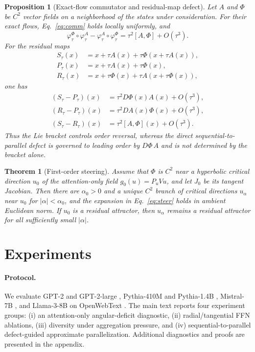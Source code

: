 \documentclass[11pt]{article}
\newtheorem{theorem}{Theorem}
\newtheorem{proposition}{Proposition}
\begin{document}
\begin{proposition}[Exact-flow commutator and residual-map defect]\label{prop:comm}
Let $A$ and $\Phi$ be $C^2$ vector fields on a neighborhood of the states under
consideration. For their exact flows, Eq.~\eqref{eq:comm} holds locally uniformly,
and
\[
\varphi^\Phi_\tau\circ\varphi^A_\tau-
\varphi^A_\tau\circ\varphi^\Phi_\tau
=\tau^2[A,\Phi]+O(\tau^3).
\]
For the residual maps
\[
\begin{aligned}
S_\tau(x)&=x+\tau A(x)+\tau\Phi(x+\tau A(x)),\\
P_\tau(x)&=x+\tau A(x)+\tau\Phi(x),\\
R_\tau(x)&=x+\tau\Phi(x)+\tau A(x+\tau\Phi(x)),
\end{aligned}
\]
one has
\[
\begin{aligned}
(S_\tau-P_\tau)(x)&=\tau^2D\Phi(x)A(x)+O(\tau^3),\\
(R_\tau-P_\tau)(x)&=\tau^2DA(x)\Phi(x)+O(\tau^3),\\
(S_\tau-R_\tau)(x)&=\tau^2[A,\Phi](x)+O(\tau^3).
\end{aligned}
\]
Thus the Lie bracket controls order reversal, whereas the direct
sequential-to-parallel defect is governed to leading order by $D\Phi\,A$ and is
not determined by the bracket alone.
\end{proposition}
\begin{theorem}[First-order steering]\label{thm:steer}
Assume that $\Phi$ is $C^2$ near a hyperbolic critical direction $u_0$ of the
attention-only field $g_0(u)=P_uVu$, and let $J_0$ be its tangent Jacobian. Then
there are $\alpha_0>0$ and a unique $C^2$ branch of critical directions
$u_\alpha$ near $u_0$ for $|\alpha|<\alpha_0$, and the expansion in Eq.~\eqref{eq:steer}
holds in ambient Euclidean norm. If $u_0$ is a residual attractor, then
$u_\alpha$ remains a residual attractor for all sufficiently small $|\alpha|$.
\end{theorem}

\section{Experiments}
\label{sec:exp}
\paragraph{Protocol.} We evaluate GPT-2 and GPT-2-large \citep{radford2019language}, Pythia-410M and Pythia-1.4B \citep{biderman2023pythia}, Mistral-7B \citep{jiang2023mistral}, and Llama-3-8B \citep{dubey2024llama} on OpenWebText \citep{gokaslan2019openwebtext}. The main text reports four experiment groups: (i) an attention-only angular-deficit diagnostic, (ii) radial/tangential FFN ablations, (iii) diversity under aggregation pressure, and (iv) sequential-to-parallel defect-guided approximate parallelization. Additional diagnostics and proofs are presented in the appendix.
\end{document}

